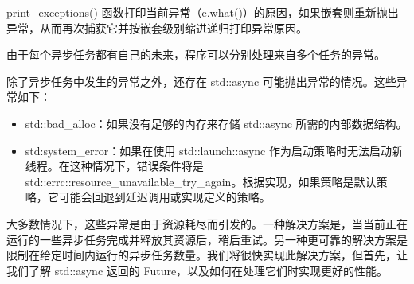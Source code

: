 print\_exceptions() 函数打印当前异常（e.what()）的原因，如果嵌套则重新抛出异常，从而再次捕获它并按嵌套级别缩进递归打印异常原因。

由于每个异步任务都有自己的未来，程序可以分别处理来自多个任务的异常。


除了异步任务中发生的异常之外，还存在 std::async 可能抛出异常的情况。这些异常如下：

\begin{itemize}
\item
std::bad\_alloc：如果没有足够的内存来存储 std::async 所需的内部数据结构。

\item
std:system\_error：如果在使用 std::launch::async 作为启动策略时无法启动新线程。在这种情况下，错误条件将是 std::errc::resource\_unavailable\_try\_again。根据实现，如果策略是默认策略，它可能会回退到延迟调用或实现定义的策略。
\end{itemize}

大多数情况下，这些异常是由于资源耗尽而引发的。一种解决方案是，当当前正在运行的一些异步任务完成并释放其资源后，稍后重试。另一种更可靠的解决方案是限制在给定时间内运行的异步任务数量。我们将很快实现此解决方案，但首先，让我们了解 std::async 返回的 Future，以及如何在处理它们时实现更好的性能。

































